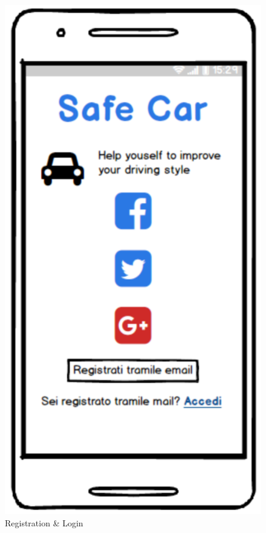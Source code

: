 \begin{figure}[!htbp]
\begin{minipage}[b]{0.45\textwidth}
  \end{minipage}
  \hfill
  \begin{minipage}[b]{0.45\textwidth}
    \includegraphics[width=\textwidth]{cpt/img/Login.png}
    \caption{Registration \& Login}
  \end{minipage}
\end{figure}

